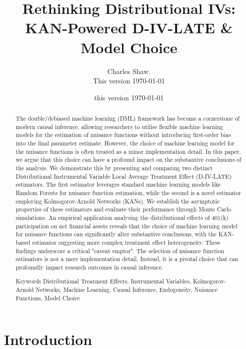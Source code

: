 \documentclass[final,3p,fleqn, 10pt]{elsarticle}
\begin{document}
\begin{frontmatter}
\title{Rethinking Distributional IVs: KAN-Powered D-IV-LATE \& Model Choice}
\author{Charles Shaw. \\This version \today}
\date{this version \today}

  \begin{abstract}
The double/debiased machine learning (DML) framework has become a cornerstone of modern causal inference, allowing researchers to utilise flexible machine learning models for the estimation of nuisance functions without introducing first-order bias into the final parameter estimate. However, the choice of machine learning model for the nuisance functions is often treated as a minor implementation detail. In this paper, we argue that this choice can have a profound impact on the substantive conclusions of the analysis. We demonstrate this by presenting and comparing two distinct Distributional Instrumental Variable Local Average Treatment Effect (D-IV-LATE) estimators. The first estimator leverages standard machine learning models like Random Forests for nuisance function estimation, while the second is a novel estimator employing Kolmogorov-Arnold Networks (KANs). We establish the asymptotic properties of these estimators and evaluate their performance through Monte Carlo simulations. An empirical application analysing the distributional effects of 401(k) participation on net financial assets reveals that the choice of machine learning model for nuisance functions can significantly alter substantive conclusions, with the KAN-based estimator suggesting more complex treatment effect heterogeneity. These findings underscore a critical "caveat emptor". The selection of nuisance function estimators is not a mere implementation detail. Instead, it is a pivotal choice that can profoundly impact research outcomes in causal inference.

\vspace{10pt}
Keywords Distributional Treatment Effects, Instrumental Variables, Kolmogorov-Arnold Networks, Machine Learning, Causal Inference, Endogeneity, Nuisance Functions, Model Choice
\end{abstract}
\end{frontmatter}

\section{Introduction}
\label{sec:introduction}
\end{document}
